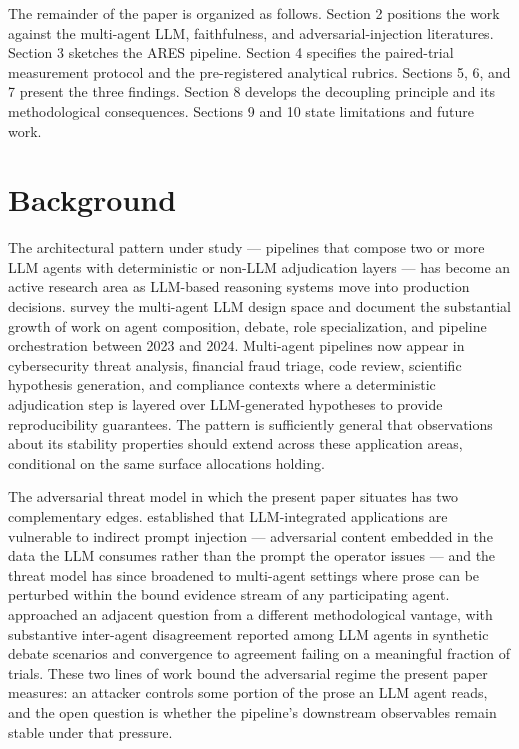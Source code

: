 \documentclass[sigconf,anonymous,review,nonacm=false]{acmart}
\begin{document}
The remainder of the paper is organized as follows. Section 2 positions the work against the multi-agent LLM, faithfulness, and adversarial-injection literatures. Section 3 sketches the ARES pipeline. Section 4 specifies the paired-trial measurement protocol and the pre-registered analytical rubrics. Sections 5, 6, and 7 present the three findings. Section 8 develops the decoupling principle and its methodological consequences. Sections 9 and 10 state limitations and future work.


\section{Background}
The architectural pattern under study — pipelines that compose two or more LLM agents with deterministic or non-LLM adjudication layers — has become an active research area as LLM-based reasoning systems move into production decisions. \citet{guo-2024} survey the multi-agent LLM design space and document the substantial growth of work on agent composition, debate, role specialization, and pipeline orchestration between 2023 and 2024. Multi-agent pipelines now appear in cybersecurity threat analysis, financial fraud triage, code review, scientific hypothesis generation, and compliance contexts where a deterministic adjudication step is layered over LLM-generated hypotheses to provide reproducibility guarantees. The pattern is sufficiently general that observations about its stability properties should extend across these application areas, conditional on the same surface allocations holding.

The adversarial threat model in which the present paper situates has two complementary edges. \citet{greshake-2023} established that LLM-integrated applications are vulnerable to indirect prompt injection — adversarial content embedded in the data the LLM consumes rather than the prompt the operator issues — and the threat model has since broadened to multi-agent settings where prose can be perturbed within the bound evidence stream of any participating agent. \citet{berdoz-rugli-wattenhofer-2026} approached an adjacent question from a different methodological vantage, with substantive inter-agent disagreement reported among LLM agents in synthetic debate scenarios and convergence to agreement failing on a meaningful fraction of trials. These two lines of work bound the adversarial regime the present paper measures: an attacker controls some portion of the prose an LLM agent reads, and the open question is whether the pipeline's downstream observables remain stable under that pressure.
\end{document}
